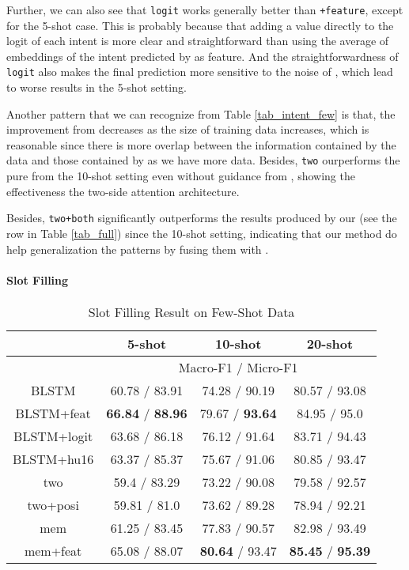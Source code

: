 Further, we can also see that \texttt{logit} works generally better than \texttt{+feature}, except for the 5-shot case. This is probably because that adding a value directly to the logit of each intent is more clear and straightforward than using the average of embeddings of the intent predicted by \RE as feature. And the straightforwardness of \texttt{logit} also makes the final prediction more sensitive to the noise of \RE, which lead to worse results in the 5-shot setting.

Another pattern that we can recognize from Table \ref{tab_intent_few} is that, the improvement from \RE decreases as the size of training data increases, which is reasonable since there is more overlap between the information contained by the data and those contained by \RE as we have more data. Besides, \texttt{two} ourperforms the pure \BLSTM from the 10-shot setting even without guidance from \RE, showing the effectiveness the two-side attention architecture.

Besides, \texttt{two+both} significantly outperforms the results produced by our \RE (see the \RE row in Table \ref{tab_full}) since the 10-shot setting, indicating that our method do help generalization the \RE patterns by fusing them with \NN. 


\paragraph{Slot Filling}

\begin{table}
\setlength{\tabcolsep}{0.23em}
\centering
\small{
\begin{tabular}{|c|c|c|c|}

\hline
  & \multicolumn{1}{|c|}{5-shot} & \multicolumn{1}{|c|}{10-shot} & \multicolumn{1}{|c|}{20-shot}  \\
 \hline
  &  \multicolumn{3}{|c|}{Macro-F1 / Micro-F1}   \\
\hline
BLSTM & 60.78 / 83.91 & 74.28  / 90.19 & 80.57 / 93.08 \\
\hline
BLSTM+feat & \textbf{66.84} / \textbf{88.96} & 79.67 / \textbf{93.64} & 84.95 / 95.0 \\
\hline
BLSTM+logit & 63.68 / 86.18 & 76.12 / 91.64  & 83.71 / 94.43 \\
\hline
BLSTM+hu16 & 63.37 / 85.37 & 75.67 / 91.06 & 80.85 / 93.47 \\
\hline
two & 59.4 / 83.29 & 73.22 / 90.08 & 79.58 / 92.57 \\
\hline
two+posi & 59.81 / 81.0 & 73.62 / 89.28 & 78.94 / 92.21 \\
\hline
mem & 61.25 / 83.45 & 77.83 / 90.57 & 82.98 / 93.49 \\
\hline
mem+feat & 65.08 / 88.07 & \textbf{80.64} / 93.47 & \textbf{85.45} / \textbf{95.39} \\
\hline
\end{tabular}
}
\caption{Slot Filling Result on Few-Shot Data}
\label{tab_slot_few}
\end{table}

